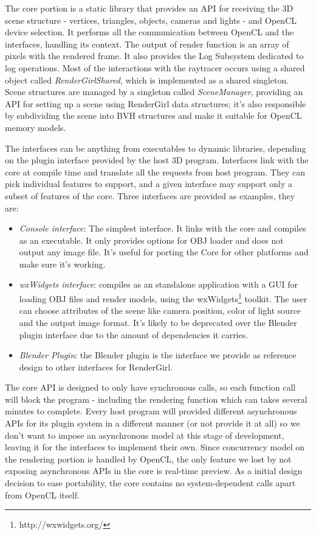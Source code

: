 \documentclass{vgtc}
\begin{document}
The core portion is a static library that provides an API for
receiving the 3D scene structure - vertices, triangles, objects,
cameras and lights - and OpenCL device selection. It performs all the
communication between OpenCL and the interfaces, handling its
context. The output of render function is an array of pixels with the
rendered frame. It also provides the Log Subsystem dedicated to log
operations. Most of the interactions with the raytracer occurs using a
shared object called \emph{RenderGirlShared}, which is implemented as
a shared singleton. Scene structures are managed by a singleton called
\emph{SceneManager}, providing an API for setting up a scene using
RenderGirl data structures; it's also responsible by subdividing the
scene into BVH structures and make it suitable for OpenCL memory
models.


The interfaces can be anything from executables to dynamic libraries,
depending on the plugin interface provided by the host 3D
program. Interfaces link with the core at compile time and translate
all the requests from host program. They can pick individual features
to support, and a given interface may support only a subset of
features of the core. Three interfaces are provided as examples, they
are:

\begin{itemize}
\item \emph{Console interface}: The simplest interface. It links with
  the core and compiles as an executable. It only provides options for
  OBJ loader and does not output any image file. It's useful for
  porting the Core for other platforms and make sure it's working.
\item \emph{wxWidgets interface}: compiles as an standalone
  application with a GUI for loading OBJ files and render models,
  using the wxWidgets\footnote{http://wxwidgets.org/} toolkit. The
  user can choose attributes of the scene like camera position, color
  of light source and the output image format. It's likely to be
  deprecated over the Blender plugin interface due to the amount of
  dependencies it carries.
\item \emph{Blender Plugin}: the Blender plugin is the interface we
  provide as reference design to other interfaces for RenderGirl.
\end{itemize}

The core API is designed to only have synchronous calls, so each
function call will block the program - including the rendering
function which can takes several minutes to complete. Every host
program will provided different asynchronous APIs for its plugin
system in a different manner (or not provide it at all) so we don't
want to impose an asynchronous model at this stage of development,
leaving it for the interfaces to implement their own. Since
concurrency model on the rendering portion is handled by OpenCL, the
only feature we lost by not exposing asynchronous APIs in the core is
real-time preview. As a initial design decision to ease portability,
the core contains no system-dependent calls apart from OpenCL itself.
\end{document}
